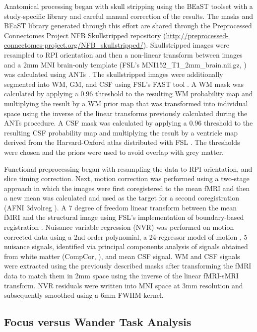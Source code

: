 Anatomical processing began with skull stripping using the BEaST toolset \cite{Eskildsen_2012} with a study-specific library and careful manual correction of the results. The masks and BEaST library generated through this effort are shared through the Preprocessed Connectomes Project NFB Skullstripped repository (\href{http://preprocessed-connectomes-project.org/NFB_skullstripped/}{http://preprocessed-connectomes-project.org/NFB\_skullstripped/})\cite{Puccio_2016}. Skullstripped images were resampled to RPI orientation and then a non-linear transform between images and a 2mm MNI brain-only template (FSL's MNI152\_T1\_2mm\_brain.nii.gz, \cite{Smith2004}) was calculated using ANTs \cite{Avants_2008}. The skullstripped images were additionally segmented into WM, GM, and CSF using FSL's FAST tool \cite{Zhang2001}. A WM mask was calculated by applying a 0.96 threshold to the resulting WM probability map and multiplying the result by a WM prior map that was transformed into individual space using the inverse of the linear transforms previously calculated during the ANTs procedure. A CSF mask was calculated by applying a 0.96 threshold to the resulting CSF probability map and multiplying the result by a ventricle map derived from the Harvard-Oxford atlas distributed with FSL \cite{Makris_2006}. The thresholds were chosen and the priors were used to avoid overlap with grey matter.

Functional preprocessing began with resampling the data to RPI orientation, and slice timing correction. Next, motion correction was performed using a two-stage approach in which the images were first coregistered to the mean fMRI and then a new mean was calculated and used as the target for a second coregistration (AFNI 3dvolreg \cite{Cox_1999}). A 7 degree of freedom linear transform between the mean fMRI and the structural image using FSL's implementation of boundary-based registration \cite{Greve2009}. Nuisance variable regression (NVR) was performed on motion corrected data using a 2nd order polynomial, a 24-regressor model of motion \cite{Friston1996a}, 5 nuisance signals, identified via principal components analysis of signals obtained from white matter (CompCor, \cite{Behzadi2007}), and mean CSF signal. WM and CSF signals were extracted using the previously described masks after transforming the fMRI data to match them in 2mm space using the inverse of the linear fMRI-sMRI transform. NVR residuals were written into MNI space at 3mm resolution and subsequently smoothed using a 6mm FWHM kernel.


\subsection{Focus versus Wander Task Analysis}


